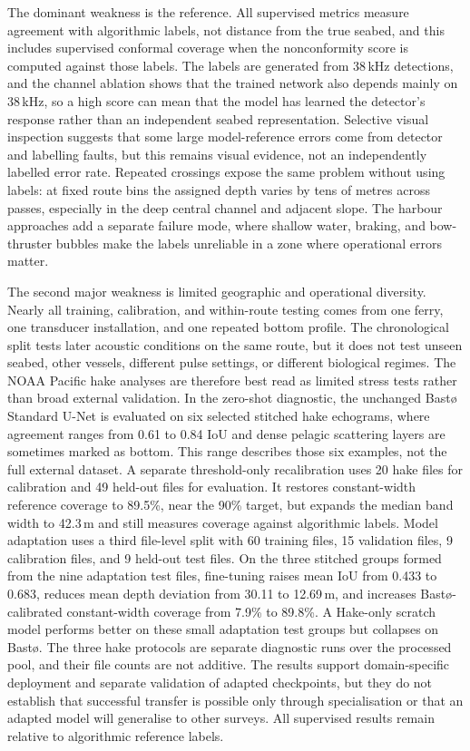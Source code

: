 The dominant weakness is the reference. All supervised metrics measure agreement with algorithmic labels, not distance from the true seabed, and this includes supervised conformal coverage when the nonconformity score is computed against those labels. The labels are generated from 38\,kHz detections, and the channel ablation shows that the trained network also depends mainly on 38\,kHz, so a high score can mean that the model has learned the detector's response rather than an independent seabed representation. Selective visual inspection suggests that some large model-reference errors come from detector and labelling faults, but this remains visual evidence, not an independently labelled error rate. Repeated crossings expose the same problem without using labels: at fixed route bins the assigned depth varies by tens of metres across passes, especially in the deep central channel and adjacent slope. The harbour approaches add a separate failure mode, where shallow water, braking, and bow-thruster bubbles make the labels unreliable in a zone where operational errors matter.

The second major weakness is limited geographic and operational diversity. Nearly all training, calibration, and within-route testing comes from one ferry, one transducer installation, and one repeated bottom profile. The chronological split tests later acoustic conditions on the same route, but it does not test unseen seabed, other vessels, different pulse settings, or different biological regimes. The NOAA Pacific hake analyses are therefore best read as limited stress tests rather than broad external validation. In the zero-shot diagnostic, the unchanged Bast\o{} Standard U-Net is evaluated on six selected stitched hake echograms, where agreement ranges from 0.61 to 0.84 IoU and dense pelagic scattering layers are sometimes marked as bottom. This range describes those six examples, not the full external dataset. A separate threshold-only recalibration uses 20 hake files for calibration and 49 held-out files for evaluation. It restores constant-width reference coverage to 89.5\%, near the 90\% target, but expands the median band width to 42.3\,m and still measures coverage against algorithmic labels. Model adaptation uses a third file-level split with 60 training files, 15 validation files, 9 calibration files, and 9 held-out test files. On the three stitched groups formed from the nine adaptation test files, fine-tuning raises mean IoU from 0.433 to 0.683, reduces mean depth deviation from 30.11 to 12.69\,m, and increases Bast\o{}-calibrated constant-width coverage from 7.9\% to 89.8\%. A Hake-only scratch model performs better on these small adaptation test groups but collapses on Bast\o{}. The three hake protocols are separate diagnostic runs over the processed pool, and their file counts are not additive. The results support domain-specific deployment and separate validation of adapted checkpoints, but they do not establish that successful transfer is possible only through specialisation or that an adapted model will generalise to other surveys. All supervised results remain relative to algorithmic reference labels.

